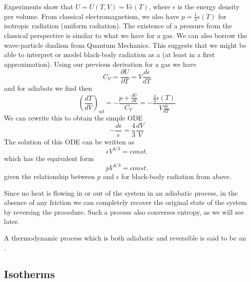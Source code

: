 \documentclass[12pt, a4paper, oneside, openright, titlepage]{book}
\begin{document}
\begin{eg}
\begin{center}
\begin{tikzpicture}[x=0.75pt,y=0.75pt,yscale=-1,xscale=1]
\end{tikzpicture}
    \end{center}
    Experiments show that $U = U(T,V) = V\epsilon(T)$, where $\epsilon$ is the energy density per volume. From classical electromagnetism, we also have $p = \frac{1}{3}\epsilon(T)$ for isotropic radiation (uniform radiation). The existence of a pressure from the classical perspective is similar to what we have for a gas. We can also borrow the wave-particle dualism from Quantum Mechanics. This suggests that we might be able to interpret or model black-body radiation as a  (at least in a first approximation). Using our previous derivation for a gas we have \begin{equation*}
        C_V = \frac{\partial U}{\partial T} = V\frac{d\epsilon}{dT}
    \end{equation*}
    and for adiabats we find then \begin{equation*}
        \left(\frac{dT}{dV}\right)_{ad} = -\frac{p + \frac{\partial U}{\partial V}}{C_V} = -\frac{\frac{4}{3}\epsilon(T)}{V\frac{d\epsilon}{dT}}
    \end{equation*}
    We can rewrite this to obtain the simple ODE \begin{equation*}
        -\frac{d\epsilon}{\epsilon} = \frac{4}{3}\frac{dV}{V}
    \end{equation*}
    The solution of this ODE can be written as \begin{equation*}
        \epsilon V^{4/3} = const.
    \end{equation*}
    which has the equivalent form \begin{equation*}
        pV^{4/3} = const.
    \end{equation*}
    given the relationship between $p$ and $\epsilon$ for black-body radiation from above.
\end{eg}


Since no heat is flowing in or out of the system in an adiabatic process, in the absence of any friction we can completely recover the original state of the system by reversing the procedure. Such a process also converses entropy, as we will see later. 

\begin{defn}
    A thermodynamic process which is both adiabatic and reversible is said to be an .
\end{defn}




\subsection{Isotherms}
\end{document}
